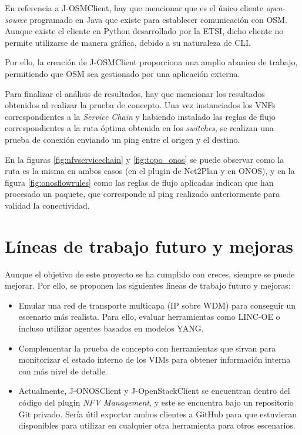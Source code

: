 En referencia a J-OSMClient, hay que mencionar que es el único cliente \textit{open-source} programado en Java que existe para establecer comunicación con \ac{OSM}. Aunque existe el cliente en Python desarrollado por la \ac{ETSI}, dicho cliente no permite utilizarse de manera gráfica, debido a su naturaleza de \ac{CLI}. 

Por ello, la creación de J-OSMClient proporciona una amplio abanico de trabajo, permitiendo que \ac{OSM} sea gestionado por una aplicación externa.

Para finalizar el análisis de resultados, hay que mencionar los resultados obtenidos al realizar la prueba de concepto. Una vez instanciados los \acp{VNF} correspondientes a la \textit{Service Chain} y habiendo instalado las reglas de flujo correspondientes a la ruta óptima obtenida en los \textit{switches}, se realizan una prueba de conexión enviando un ping entre el origen y el destino. 

En la figuras \ref{fig:nfvservicechain} y \ref{fig:topo_onos} se puede observar como la ruta es la misma en ambos casos (en el plugin de Net2Plan y en \ac{ONOS}), y en la figura \ref{fig:onosflowrules} como las reglas de flujo aplicadas indican que han procesado un paquete, que corresponde al ping realizado anteriormente para validad la conectividad.


\section{Líneas de trabajo futuro y mejoras}

Aunque el objetivo de este proyecto se ha cumplido con creces, siempre se puede mejorar. Por ello, se proponen las siguientes líneas de trabajo futuro y mejoras:

\begin{itemize}
	
	\item Emular una red de transporte multicapa (\ac{IP} sobre \ac{WDM}) para conseguir un escenario más realista. Para ello, evaluar herramientas como LINC-OE\cite{lincoebib} o incluso utilizar agentes basados en modelos \ac{YANG}.
	
	\item Complementar la prueba de concepto con herramientas que sirvan para monitorizar el estado interno de los \acp{VIM} para obtener información interna con más nivel de detalle.
	
	\item Actualmente, J-ONOSClient y J-OpenStackClient se encuentran dentro del código del plugin \textit{NFV Management}, y este se encuentra bajo un repositorio Git privado. Sería útil exportar ambos clientes a GitHub para que estuvieran disponibles para utilizar en cualquier otra herramienta para otros escenarios.
	
\end{itemize}

\cleardoublepage